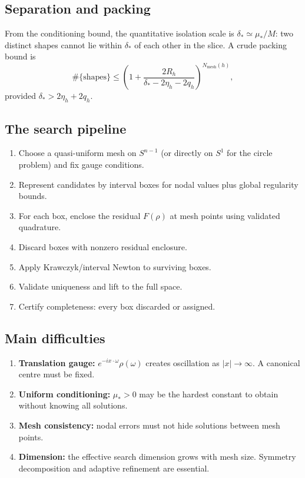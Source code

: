 \documentclass[12pt]{article}
\theoremstyle{definition}
\theoremstyle{remark}
\begin{document}
\subsection{Separation and packing}

From the conditioning bound, the quantitative isolation scale is
$\delta_*\simeq\mu_*/M$: two distinct shapes cannot lie within
$\delta_*$ of each other in the slice.  A crude packing bound is
\[
  \#\{\text{shapes}\}
  \leq
  \left(1+\frac{2R_h}{\delta_*-2\eta_h-2q_h}\right)^{N_{\mathrm{mesh}}(h)},
\]
provided $\delta_*>2\eta_h+2q_h$.

\subsection{The search pipeline}

\begin{enumerate}[leftmargin=2em]
  \item Choose a quasi-uniform mesh on $S^{n-1}$ (or directly on $S^1$
    for the circle problem) and fix gauge conditions.
  \item Represent candidates by interval boxes for nodal values plus global
    regularity bounds.
  \item For each box, enclose the residual $F(\rho)$ at mesh points using
    validated quadrature.
  \item Discard boxes with nonzero residual enclosure.
  \item Apply Krawczyk/interval Newton to surviving boxes.
  \item Validate uniqueness and lift to the full space.
  \item Certify completeness: every box discarded or assigned.
\end{enumerate}

\subsection{Main difficulties}

\begin{enumerate}[leftmargin=2em]
  \item \textbf{Translation gauge:} $e^{-ix\cdot\omega}\rho(\omega)$ creates
    oscillation as $|x|\to\infty$.  A canonical centre must be fixed.
  \item \textbf{Uniform conditioning:} $\mu_*>0$ may be the hardest
    constant to obtain without knowing all solutions.
  \item \textbf{Mesh consistency:} nodal errors must not hide solutions
    between mesh points.
  \item \textbf{Dimension:} the effective search dimension grows with
    mesh size.  Symmetry decomposition and adaptive refinement are essential.
\end{enumerate}
\end{document}
